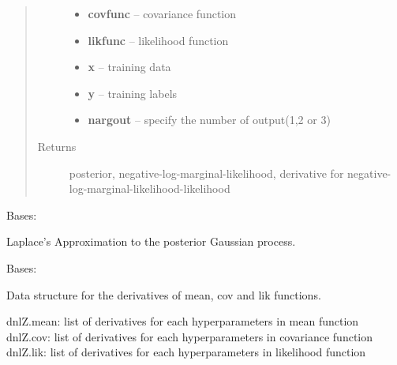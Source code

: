 \documentclass[letterpaper,10pt,english]{sphinxmanual}
\begin{document}
\begin{fulllineitems}
\begin{fulllineitems}
\begin{quote}
\begin{description}
\begin{itemize}
\item {} 
\textbf{covfunc} -- covariance function

\item {} 
\textbf{likfunc} -- likelihood function

\item {} 
\textbf{x} -- training data

\item {} 
\textbf{y} -- training labels

\item {} 
\textbf{nargout} -- specify the number of output(1,2 or 3)

\end{itemize}

\item[{Returns}] \leavevmode
posterior, negative-log-marginal-likelihood, derivative for negative-log-marginal-likelihood-likelihood

\end{description}\end{quote}

\end{fulllineitems}


\end{fulllineitems}


\begin{fulllineitems}
\label{pyGPs.Core:pyGPs.Core.inf.Laplace}
Bases: {\hyperref[pyGPs.Core:pyGPs.Core.inf.Inference]{}}

Laplace's Approximation to the posterior Gaussian process.

\begin{fulllineitems}
\label{pyGPs.Core:pyGPs.Core.inf.Laplace.proceed}
\end{fulllineitems}


\end{fulllineitems}


\begin{fulllineitems}
\label{pyGPs.Core:pyGPs.Core.inf.dnlZStruct}
Bases: 

Data structure for the derivatives of mean, cov and lik functions.

{\color{red}\bfseries{}\textbar{}}dnlZ.mean: list of derivatives for each hyperparameters in mean function
{\color{red}\bfseries{}\textbar{}}dnlZ.cov: list of derivatives for each hyperparameters in covariance function
{\color{red}\bfseries{}\textbar{}}dnlZ.lik: list of derivatives for each hyperparameters in likelihood function

\end{fulllineitems}
\end{document}

